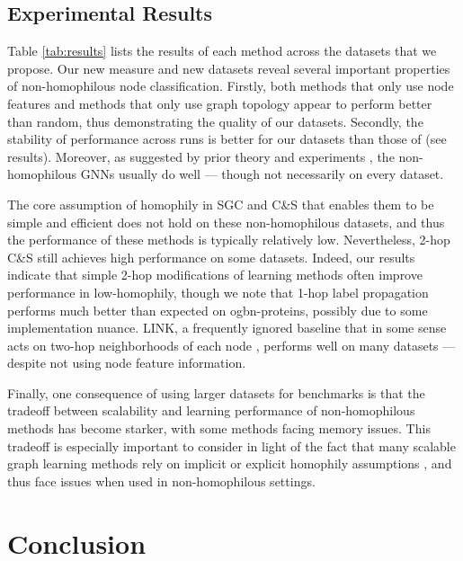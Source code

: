 \documentclass[sigconf, balance=false]{acmart}
\begin{document}
\subsection{Experimental Results}

Table \ref{tab:results} lists the results of each method across the datasets that we propose. Our new measure and new datasets reveal several important properties of non-homophilous node classification. Firstly, both methods that only use node features and methods that only use graph topology appear to perform better than random, thus demonstrating the quality of our datasets. Secondly, the stability of performance across runs is better for our datasets than those of \citet{pei2019geom} (see \cite{zhu2020beyond} results). Moreover, as suggested by prior theory and experiments \cite{zhu2020beyond, abu2019mixhop, chien2021adaptive}, the non-homophilous GNNs usually do well --- though not necessarily on every dataset.

The core assumption of homophily in SGC and C\&S that enables them to be simple and efficient does not hold on these non-homophilous datasets, and thus the performance of these methods is typically relatively low. Nevertheless, 2-hop C\&S still achieves high performance on some datasets. Indeed, our results indicate that simple 2-hop modifications of learning methods often improve performance in low-homophily, though we note that 1-hop label propagation performs much better than expected on ogbn-proteins, possibly due to some implementation nuance. LINK, a frequently ignored baseline that in some sense acts on two-hop neighborhoods of each node \cite{altenburger2018monophily}, performs well on many datasets --- despite not using node feature information. 


Finally, one consequence of using larger datasets for benchmarks is that the tradeoff between scalability and learning performance of non-homophilous methods has become starker, with some methods facing memory issues. This tradeoff is especially important to consider in light of the fact that many scalable graph learning methods rely on implicit or explicit homophily assumptions \cite{wu2019simplifying, huang2021combining, deng2020graphzoom, bojchevski2020scaling}, and thus face issues when used in non-homophilous settings.


\section{Conclusion}
\end{document}
